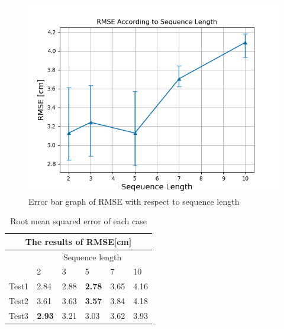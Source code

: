 \documentclass[letterpaper, 10 pt, conference]{ieeeconf}  %
\begin{document}


\begin{figure}[h!]
	\centering
	\includegraphics[width=0.9\linewidth]{image/seq_result_prototype}
	\caption{Error bar graph of RMSE with respect to sequence length}
	\label{fig:seq_length} 	
\end{figure}


\begin{table}[h]
	\centering
	\caption{Root mean squared error of each case}
	\begin{tabular}{clllll}
		\toprule
		\multicolumn{6}{c}{The results of RMSE[cm]}                         \\
		\midrule
		& \multicolumn{5}{c}{Sequence length} \\  \cmidrule{2-6}
		
		\multicolumn{1}{l}{} & 2     & 3       & 5      & 7    & 10  \\
		Test1                & 2.84  & 2.88    & \textbf{2.78}   & 3.65 & 4.16 \\
		Test2                & 3.61  & 3.63    & \textbf{3.57}   & 3.84 & 4.18 \\
		Test3                & \textbf{2.93}  & 3.21    & 3.03   & 3.62 & 3.93 \\
		\bottomrule 
		
	\end{tabular}
	\label{table:RMSE_sequence}
\end{table}
\end{document}
